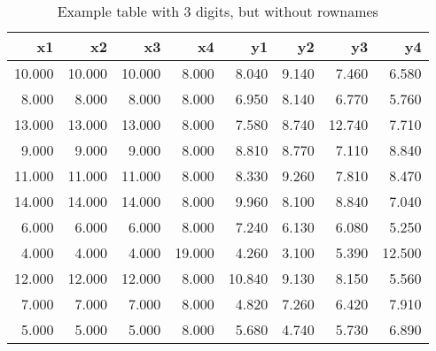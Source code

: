 \documentclass[10pt, fullpage, a4paper, titlepage]{article}
\begin{document}
\begin{table}[ht]
\centering
\begin{tabular}{rrrrrrrr}
  \hline
x1 & x2 & x3 & x4 & y1 & y2 & y3 & y4 \\ 
  \hline
10.000 & 10.000 & 10.000 & 8.000 & 8.040 & 9.140 & 7.460 & 6.580 \\ 
  8.000 & 8.000 & 8.000 & 8.000 & 6.950 & 8.140 & 6.770 & 5.760 \\ 
  13.000 & 13.000 & 13.000 & 8.000 & 7.580 & 8.740 & 12.740 & 7.710 \\ 
  9.000 & 9.000 & 9.000 & 8.000 & 8.810 & 8.770 & 7.110 & 8.840 \\ 
  11.000 & 11.000 & 11.000 & 8.000 & 8.330 & 9.260 & 7.810 & 8.470 \\ 
  14.000 & 14.000 & 14.000 & 8.000 & 9.960 & 8.100 & 8.840 & 7.040 \\ 
  6.000 & 6.000 & 6.000 & 8.000 & 7.240 & 6.130 & 6.080 & 5.250 \\ 
  4.000 & 4.000 & 4.000 & 19.000 & 4.260 & 3.100 & 5.390 & 12.500 \\ 
  12.000 & 12.000 & 12.000 & 8.000 & 10.840 & 9.130 & 8.150 & 5.560 \\ 
  7.000 & 7.000 & 7.000 & 8.000 & 4.820 & 7.260 & 6.420 & 7.910 \\ 
  5.000 & 5.000 & 5.000 & 8.000 & 5.680 & 4.740 & 5.730 & 6.890 \\ 
   \hline
\end{tabular}
\caption{Example table with 3 digits, but without rownames} 
\label{ACtable3norow}
\end{table}
\end{document}

